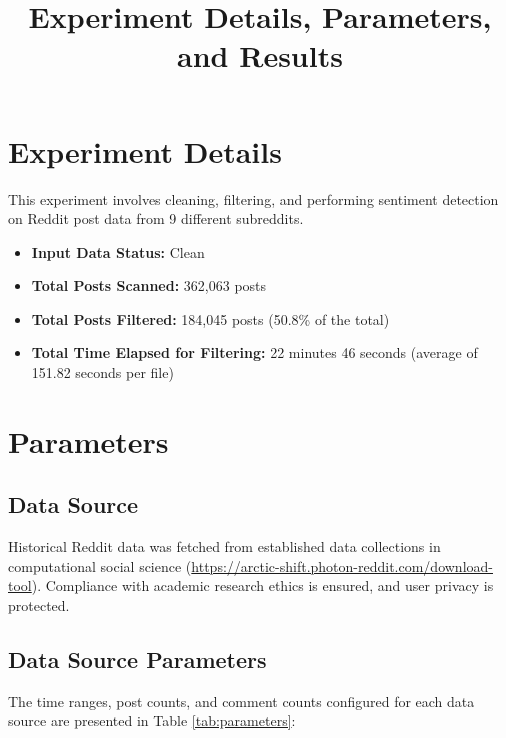 \documentclass{article}
\title{Experiment Details, Parameters, and Results}
\author{}
\date{}
\begin{document}
\maketitle

\section{Experiment Details}
This experiment involves cleaning, filtering, and performing sentiment detection on Reddit post data from 9 different subreddits.
\begin{itemize}
    \item \textbf{Input Data Status:} Clean
    \item \textbf{Total Posts Scanned:} 362,063 posts
    \item \textbf{Total Posts Filtered:} 184,045 posts (50.8\% of the total)
    \item \textbf{Total Time Elapsed for Filtering:} 22 minutes 46 seconds (average of 151.82 seconds per file)
\end{itemize}

\section{Parameters}

\subsection{Data Source}
Historical Reddit data was fetched from established data collections in computational social science (\url{https://arctic-shift.photon-reddit.com/download-tool}). Compliance with academic research ethics is ensured, and user privacy is protected.

\subsection{Data Source Parameters}
The time ranges, post counts, and comment counts configured for each data source are presented in Table \ref{tab:parameters}:
\end{document}
